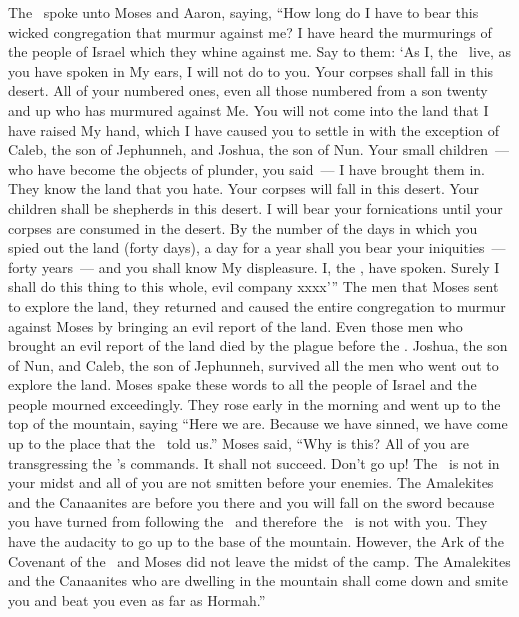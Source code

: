 \begin{inparaenum}
   The \lord\ spoke unto Moses and Aaron, saying,%
   ``How long do I have to bear this wicked congregation that murmur against me? I have heard the murmurings of the people of Israel which they whine against me.%
   Say to them: `As I, the \lord\ live, as you have spoken in My ears, I will not do to you.%
   Your corpses shall fall in this desert. All of your numbered ones, even all those numbered from a son twenty and up who has murmured against Me.%
   You will not come into the land that I have raised My hand, which I have caused you to settle in with the exception of Caleb, the son of Jephunneh, and Joshua, the son of Nun.%
   Your small children~--- who have become the objects of plunder, you said~--- I have brought them in. They know the land that you hate.%
   Your corpses will fall in this desert.%
   Your children shall be shepherds in this desert. I will bear your fornications until your corpses are consumed in the desert.%
   By the number of the days in which you spied out the land (forty days), a day for a year shall you bear your iniquities~--- forty years~--- and you shall know My displeasure.%
   I, the \lord, have spoken. Surely I shall do this thing to this whole, evil company xxxx'\thinspace''%
   The men that Moses sent to explore the land, they returned and caused the entire congregation to murmur against Moses by bringing an evil report of the land.%
   Even those men who brought an evil report of the land died by the plague before the \lord.%
   Joshua, the son of Nun, and Caleb, the son of Jephunneh, survived all the men who went out to explore the land.%
   Moses spake these words to all the people of Israel and the people mourned exceedingly.%
   They rose early in the morning and went up to the top of the mountain, saying ``Here we are. Because we have sinned, we have come up to the place that the \lord\ told us.''%
   Moses said, ``Why is this? All of you are transgressing the \lord's commands. It shall not succeed.%
   Don't go up! The \lord\ is not in your midst and all of you are not smitten before your enemies.%
   The Amalekites and the Canaanites are before you there and you will fall on the sword because you have turned from following the \lord\ and therefore\understood\ the \lord\ is not with you.%
   They have the audacity to go up to the base of the mountain. However, the Ark of the Covenant of the \lord\ and Moses did not leave the midst of the camp.%
   The Amalekites and the Canaanites who are dwelling in the mountain shall come down and smite you and beat you even as far as Hormah.''%
\end{inparaenum}
